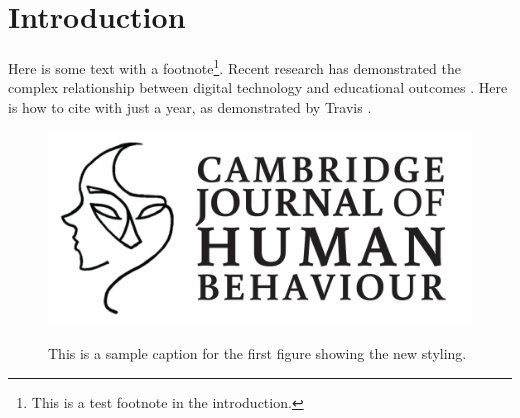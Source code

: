 \documentclass[12pt]{article}
\begin{document}
\section{Introduction}
\begin{sectiontext}
Here is some text with a footnote\footnote{This is a test footnote in the introduction.}. Recent research has demonstrated the complex relationship between digital technology and educational outcomes \parencite{patel2023divide}. Here is how to cite with just a year, as demonstrated by Travis \parencite{2023}. \lipsum

\begin{figure}
    \caption{This is a sample caption for the first figure showing the new styling.}
    \includegraphics[width=\linewidth]{images/article_upper_logo.png}
    \label{fig:first}
\end{figure}


\end{sectiontext}
\end{document}
